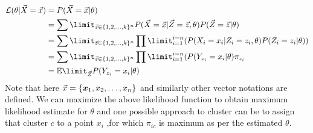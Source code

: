 \documentclass[12pt]{article}
\begin{document}
\begin{equation}
    \begin{split}
        \mathcal{L}(\theta| \vec{X}=\vec{x})&=P(\vec{X}=\vec{x}|\theta)\\
                        &=\sum\limit_{\vec{z}\in \{1,2,\dots,k\}^n}P(\vec{X}=\vec{x}|\vec{Z}=\vec{z},\theta)P(\vec{Z}=\vec{z}|\theta)\\
                        &=\sum\limit_{\vec{z}\in \{1,2,\dots,k\}^n}\prod\limit_{i=1}^{i=n}(P(X_i=x_i|Z_i=z_i,\theta)P(Z_i=z_i|\theta))\\
                        &=\sum\limit_{\vec{z}\in \{1,2,\dots,k\}^n}\prod\limit_{i=1}^{i=n}(P(Y_{z_i}=x_i|\theta)\pi_{z_i}\\
                        &=\mathbb{E}\limit_{\vec{Z}}P(Y_{z_i}=x_i|\theta)\\
    \end{split}
\end{equation}
Note that here $\vec{x}=\{{\boldsymbol x}_1,x_2,\dots,x_n\}$ and similarly other vector notations are defined. We can maximize the above likelihood function to obtain maximum likelihood estimate for $\theta$ and one possible approach to cluster can be to assign that cluster $c$ to a point $x_i$ ,for which $\pi_{ic}$ is maximum as per the estimated $\theta$.
\end{document}

